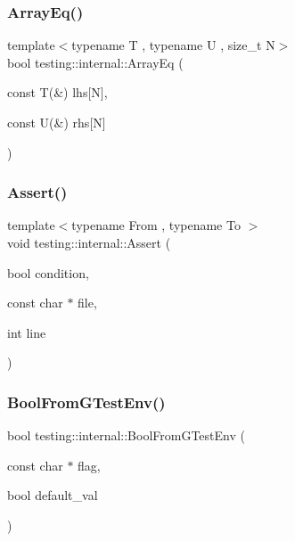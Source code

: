 \mbox{\label{namespacetesting_1_1internal_a5cb6f81ee827130024261121c742b26c}} 
\subsubsection{\texorpdfstring{ArrayEq()}{ArrayEq()}\hspace{0.1cm}{\footnotesize\ttfamily [3/3]}}
{\footnotesize\ttfamily template$<$typename T , typename U , size\+\_\+t N$>$ \\
bool testing\+::internal\+::\+Array\+Eq (\begin{DoxyParamCaption}\item[{const T(\&)}]{lhs\mbox{[}\+N\mbox{]},  }\item[{const U(\&)}]{rhs\mbox{[}\+N\mbox{]} }\end{DoxyParamCaption})\hspace{0.3cm}{\ttfamily [inline]}}

\mbox{\label{namespacetesting_1_1internal_a7a259643b7f2d23ce2b757728df42c99}} 
\subsubsection{\texorpdfstring{Assert()}{Assert()}}
{\footnotesize\ttfamily template$<$typename From , typename To $>$ \\
void testing\+::internal\+::\+Assert (\begin{DoxyParamCaption}\item[{bool}]{condition,  }\item[{const char $\ast$}]{file,  }\item[{int}]{line }\end{DoxyParamCaption})\hspace{0.3cm}{\ttfamily [inline]}}

\mbox{\label{namespacetesting_1_1internal_a67132cdce23fb71b6c38ee34ef81eb4c}} 
\subsubsection{\texorpdfstring{BoolFromGTestEnv()}{BoolFromGTestEnv()}}
{\footnotesize\ttfamily bool testing\+::internal\+::\+Bool\+From\+G\+Test\+Env (\begin{DoxyParamCaption}\item[{const char $\ast$}]{flag,  }\item[{bool}]{default\+\_\+val }\end{DoxyParamCaption})}

